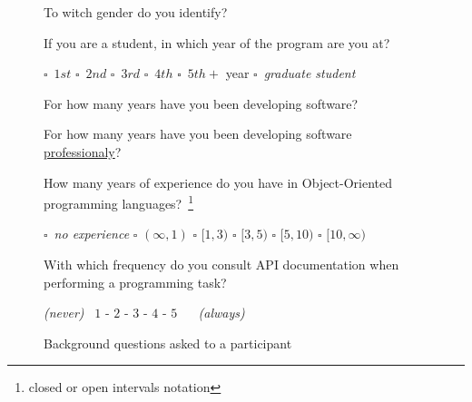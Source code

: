 \begin{figure}
\begin{mdframed}[backgroundcolor=gray!15] 
\begin{scriptsize}

\noindent To witch gender do you identify? 

\medskip

\noindent If you are a student, in which year of the program are you at?  \smallskip

\quad $\square$~$1st$  
\quad $\square$~$2nd$  
\quad $\square$~$3rd$  
\quad $\square$~$4th$  
\quad $\square$~$5th+$ year 
\quad $\square$~\textit{graduate student} 

\medskip

\noindent For how many years have you been developing software?  

\medskip

\noindent For how many years have you been developing software \underline{professionaly}? 

\medskip

\noindent How many years of experience do you have in Object-Oriented programming languages?~\footnote{\scriptsize closed or open intervals notation} \smallskip

\quad $\square$~\textit{no experience} 
\quad $\square$ $(\infty, 1)$
\quad $\square$ $[1, 3)$
\quad $\square$ $[3, 5)$
\quad $\square$ $[5, 10)$
\quad $\square$ $[10, \infty)$

\medskip

\noindent With which frequency do you consult API documentation when performing a programming task?  \smallskip

\quad \textit{(never)} ~$1$ - $2$ - $3$ - $4$ - $5$ ~ ~\textit{(always)} 

\end{scriptsize}
\end{mdframed}
\caption{Background questions asked to a participant}
\label{fig:experiment-demographics}
\end{figure}

    
